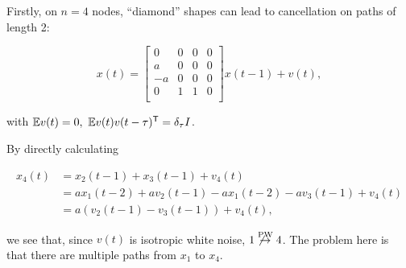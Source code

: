 \documentclass[12pt]{article}
\def\pwgc{\overset{\text{PW}}{\rightarrow}}  %
\begin{document}
\begin{example}
  \label{ex:diamond_cancellation}
  Firstly, on $n = 4$ nodes, ``diamond'' shapes can lead to cancellation on paths of length 2:

\begin{equation*}
  x(t) =
  \left[
    \begin{array}{cccc}
      0 & 0 & 0 & 0\\
      a & 0 & 0 & 0\\
      -a & 0 & 0 & 0\\
      0 & 1 & 1 & 0\\
    \end{array}
  \right] x(t - 1) + v(t),
\end{equation*}

with $\mathbb{E} v(t) = 0,\ \mathbb{E} v(t)v(t - \tau)^{\mathsf{T}} = \delta_\tau I$.

By directly calculating

\begin{align*}
  x_4(t) &= x_2(t - 1) + x_3(t - 1) + v_4(t)\\
         &= ax_1(t - 2) + av_2(t - 1) - ax_1(t - 2) -av_3(t - 1) + v_4(t)\\
         &= a(v_2(t - 1) - v_3(t - 1)) + v_4(t),
\end{align*}

we see that, since $v(t)$ is isotropic white noise, $1 \not\pwgc 4$.  The problem here is that there are multiple paths from $x_1$ to $x_4$.
\end{example}
\end{document}
